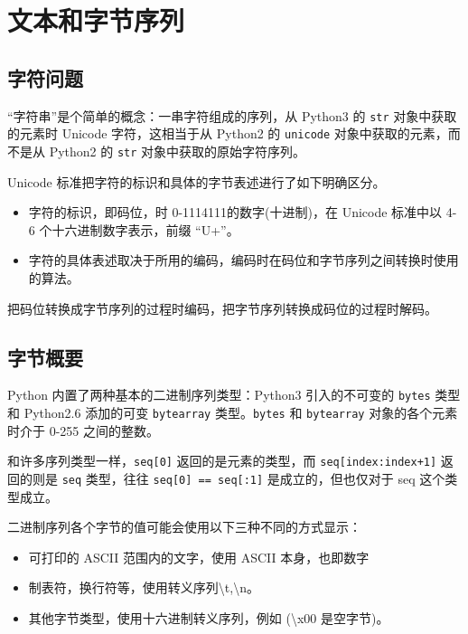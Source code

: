 \section{文本和字节序列}
\subsection{字符问题}

``字符串''是个简单的概念：一串字符组成的序列，从 Python3 的 \texttt{str} 对象中获取的元素时 Unicode 字符，这相当于从 Python2 的 \texttt{unicode} 对象中获取的元素，而不是从 Python2 的 \texttt{str} 对象中获取的原始字符序列。

Unicode 标准把字符的标识和具体的字节表述进行了如下明确区分。
\begin{itemize}
    \item 字符的标识，即码位，时 0-1114111的数字(十进制)，在 Unicode 标准中以 4-6 个十六进制数字表示，前缀 ``U+''。
    \item 字符的具体表述取决于所用的编码，编码时在码位和字节序列之间转换时使用的算法。
\end{itemize}

把码位转换成字节序列的过程时编码，把字节序列转换成码位的过程时解码。



\subsection{字节概要}

Python 内置了两种基本的二进制序列类型：Python3 引入的不可变的 \texttt{bytes} 类型和 Python2.6 添加的可变 \texttt{bytearray} 类型。\texttt{bytes} 和 \texttt{bytearray} 对象的各个元素时介于 0-255 之间的整数。  



和许多序列类型一样，\texttt{seq[0]} 返回的是元素的类型，而 \texttt{seq[index:index+1]} 返回的则是 \texttt{seq} 类型，往往 \texttt{seq[0] == seq[:1]} 是成立的，但也仅对于 seq 这个类型成立。

二进制序列各个字节的值可能会使用以下三种不同的方式显示：
\begin{itemize}
    \item 可打印的 ASCII 范围内的文字，使用 ASCII 本身，也即数字
    \item 制表符，换行符等，使用转义序列\textbackslash t,\textbackslash n。
    \item 其他字节类型，使用十六进制转义序列，例如 (\textbackslash x00 是空字节)。
\end{itemize}

